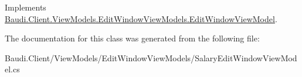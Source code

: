 Implements \hyperlink{class_baudi_1_1_client_1_1_view_models_1_1_edit_window_view_models_1_1_edit_window_view_model_aeae328bfe7608e01ce3c54da0c13f781}{Baudi.\+Client.\+View\+Models.\+Edit\+Window\+View\+Models.\+Edit\+Window\+View\+Model}.



The documentation for this class was generated from the following file\+:\begin{DoxyCompactItemize}
\item 
Baudi.\+Client/\+View\+Models/\+Edit\+Window\+View\+Models/Salary\+Edit\+Window\+View\+Model.\+cs\end{DoxyCompactItemize}
